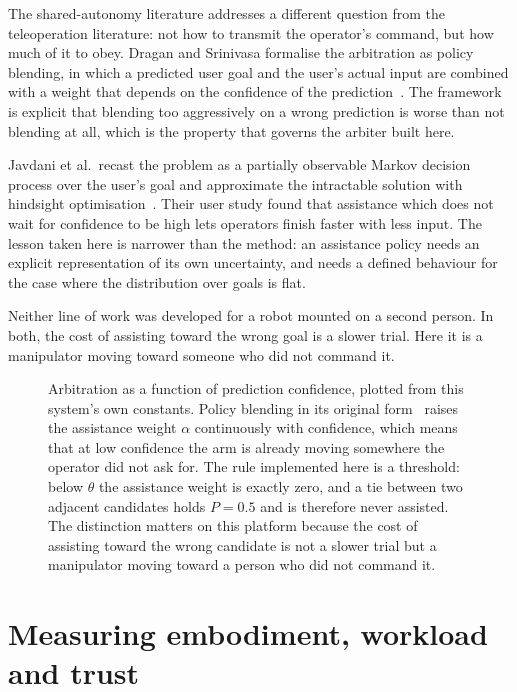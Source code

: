 The shared-autonomy literature addresses a different question from the
teleoperation literature: not how to transmit the operator's command, but how
much of it to obey. Dragan and Srinivasa formalise the arbitration as policy
blending, in which a predicted user goal and the user's actual input are
combined with a weight that depends on the confidence of the
prediction~\cite{dragan2013policyblending}. The framework is explicit that
blending too aggressively on a wrong prediction is worse than not blending at
all, which is the property that governs the arbiter built here.

Javdani et al.\ recast the problem as a partially observable Markov decision
process over the user's goal and approximate the intractable solution with
hindsight optimisation~\cite{javdani2015hindsight}. Their user study found
that assistance which does not wait for confidence to be high lets operators
finish faster with less input. The lesson taken here is narrower than the
method: an assistance policy needs an explicit representation of its own
uncertainty, and needs a defined behaviour for the case where the
distribution over goals is flat.

Neither line of work was developed for a robot mounted on a second person. In
both, the cost of assisting toward the wrong goal is a slower trial. Here it
is a manipulator moving toward someone who did not command it.

\begin{figure}[htbp]
  \centering
  
  \caption[Arbitration against prediction confidence]{Arbitration as a
  function of prediction confidence, plotted from this system's own
  constants. Policy blending in its original form~\cite{dragan2013policyblending}
  raises the assistance weight $\alpha$ continuously with confidence, which
  means that at low confidence the arm is already moving somewhere the
  operator did not ask for. The rule implemented here is a threshold: below
  $\theta$ the assistance weight is exactly zero, and a tie between two
  adjacent candidates holds $P = \num{0.5}$ and is therefore never assisted.
  The distinction matters on this platform because the cost of assisting
  toward the wrong candidate is not a slower trial but a manipulator moving
  toward a person who did not command it.}
  \label{fig:arbitration}
\end{figure}

\section{Measuring embodiment, workload and trust}

